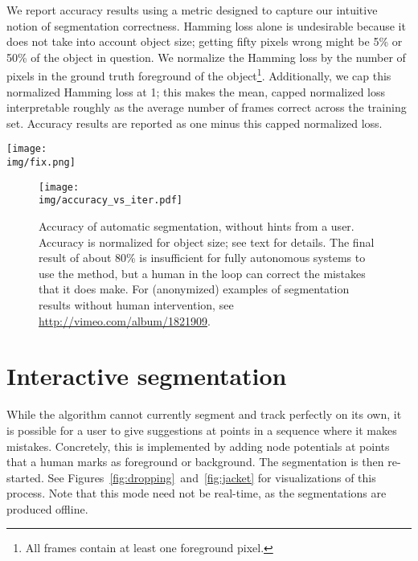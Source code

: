 \documentclass[conference]{IEEEtran}
\newcommand{\img}{img}
\begin{document}
We report accuracy results using a metric designed to capture our intuitive notion of segmentation correctness.  Hamming loss alone is undesirable because it does not take into account object size; getting fifty pixels wrong might be 5\% or 50\% of the object in question.  We normalize the Hamming loss by the number of pixels in the ground truth foreground of the object\footnote{All frames contain at least one foreground pixel.}.  Additionally, we cap this normalized Hamming loss at 1; this makes the mean, capped normalized loss interpretable roughly as the average number of frames correct across the training set.  Accuracy results are reported as one minus this capped normalized loss.

\begin{figure*}
  \centering
  \texttt{[image: \\img/fix.png]}
  \caption{Example interactive segmentation of a sequence.  One initial frame is labeled to indicate that the paper is to be tracked, and one additional frame is labeled to ensure that the carpet at the edge of the scene does not get labeled as foreground.}  \label{fig:dropping}
\end{figure*}


\begin{figure}
  \centering
  \texttt{[image: \\img/accuracy\_vs\_iter.pdf]}
  \caption{Accuracy of automatic segmentation, without hints from a user.  Accuracy is normalized for object size; see text for details.  The final result of about 80\% is insufficient for fully autonomous systems to use the method, but a human in the loop can correct the mistakes that it does make.  For (anonymized) examples of segmentation results without human intervention, see \href{http://vimeo.com/album/1821909}{http://vimeo.com/album/1821909}.}
  \label{fig:avi}
\end{figure}

\section{Interactive segmentation}
\label{sec:interactive}

While the algorithm cannot currently segment and track perfectly on its own, it is possible for a user to give suggestions at points in a sequence where it makes mistakes.  Concretely, this is implemented by adding node potentials at points that a human marks as foreground or background.  The segmentation is then re-started.  See Figures~\ref{fig:dropping}~and~\ref{fig:jacket} for visualizations of this process.  Note that this mode need not be real-time, as the segmentations are produced offline.
\end{document}
